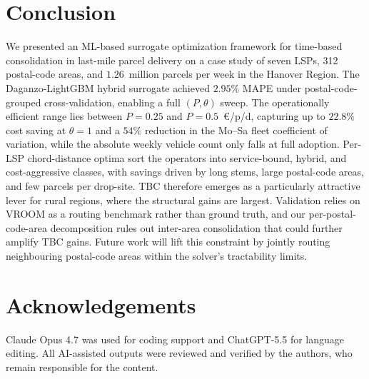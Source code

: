 \documentclass[3p,times,procedia]{elsarticle}
\begin{document}
\section{Conclusion}
\label{concl}

We presented an ML-based surrogate optimization framework for time-based consolidation in last-mile parcel delivery on a case study of seven LSPs, 312 postal-code areas, and $1.26$~million parcels per week in the Hanover Region. The Daganzo-LightGBM hybrid surrogate achieved $2.95\%$ MAPE under postal-code-grouped cross-validation, enabling a full $(P, \theta)$ sweep. The operationally efficient range lies between $P = 0.25$ and $P = 0.5$~\euro/p/d, capturing up to $22.8\%$ cost saving at $\theta = 1$ and a $54\%$ reduction in the Mo--Sa fleet coefficient of variation, while the absolute weekly vehicle count only falls at full adoption. Per-LSP chord-distance optima sort the operators into service-bound, hybrid, and cost-aggressive classes, with savings driven by long stems, large postal-code areas, and few parcels per drop-site. TBC therefore emerges as a particularly attractive lever for rural regions, where the structural gains are largest. Validation relies on VROOM as a routing benchmark rather than ground truth, and our per-postal-code-area decomposition rules out inter-area consolidation that could further amplify TBC gains. Future work will lift this constraint by jointly routing neighbouring postal-code areas within the solver's tractability limits.




\section*{Acknowledgements}

Claude Opus 4.7 was used for coding support and ChatGPT-5.5 for language editing. All AI-assisted outputs were reviewed and verified by the authors, who remain responsible for the content.





\end{document}
